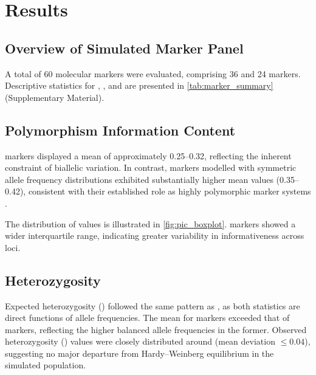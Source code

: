 
\section{Results}
\label{sec:results}

\subsection{Overview of Simulated Marker Panel}

A total of 60 molecular markers were evaluated, comprising 36 \snp{} and
24 \ssr{} markers. Descriptive statistics for \pic{}, \he{}, and \ho{}
are presented in \cref{tab:marker_summary} (Supplementary Material).

\subsection{Polymorphism Information Content}

\snp{} markers displayed a mean \pic{} of approximately 0.25--0.32,
reflecting the inherent constraint of biallelic variation. In contrast,
\ssr{} markers modelled with symmetric allele frequency distributions
exhibited substantially higher mean \pic{} values (0.35--0.42), consistent
with their established role as highly polymorphic marker systems
\autocite{Powell1996}.

The distribution of \pic{} values is illustrated in
\cref{fig:pic_boxplot}. \ssr{} markers showed a wider interquartile
range, indicating greater variability in informativeness across loci.

\subsection{Heterozygosity}

Expected heterozygosity (\he{}) followed the same pattern as \pic{},
as both statistics are direct functions of allele frequencies. The
mean \he{} for \ssr{} markers exceeded that of \snp{} markers,
reflecting the higher balanced allele frequencies in the former.
Observed heterozygosity (\ho{}) values were closely distributed around
\he{} (mean deviation $\leq 0.04$), suggesting no major departure from
Hardy--Weinberg equilibrium in the simulated population.
